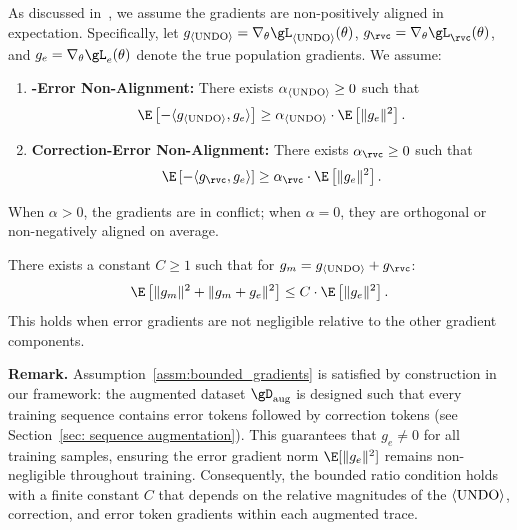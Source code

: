 \begin{assumption}\label{assm:gradient_conflict}
As discussed in~\citet{yu2020gradient}, we assume the gradients are non-positively aligned in expectation. Specifically, let $g_{\bk} = \nabla_\theta \gL_{\bk}(\theta)$, $g_\rvc = \nabla_\theta \gL_\rvc(\theta)$, and $g_e = \nabla_\theta \gL_e(\theta)$ denote the true population gradients.
We assume:
\begin{enumerate}[label=(\alph*), noitemsep, topsep=2pt]
    \item \textbf{\bk-Error Non-Alignment:} There exists $\alpha_{\langle\textnormal{UNDO}\rangle} \geq 0$ such that
    \begin{equation}
        \E\left[-\langle g_{\bk}, g_e \rangle\right] \geq \alpha_{\bk} \cdot \E\left[\|g_e\|^2\right].
    \end{equation}
    \item \textbf{Correction-Error Non-Alignment:} There exists $\alpha_\rvc \geq 0$ such that
    \begin{equation}
        \E\left[-\langle g_\rvc, g_e \rangle\right] \geq \alpha_\rvc \cdot \E\left[\|g_e\|^2\right].
    \end{equation}
\end{enumerate}
When $\alpha > 0$, the gradients are in conflict; when $\alpha = 0$, they are orthogonal or non-negatively aligned on average.
\end{assumption}


\begin{assumption}\label{assm:bounded_gradients}
There exists a constant $C \geq 1$ such that for $g_m = g_{\bk} + g_\rvc$:
\begin{equation}
    \E\left[\|g_m\|^2 + \|g_m + g_e\|^2\right] \leq C \cdot \E\left[\|g_e\|^2\right].
\end{equation}
This holds when error gradients are not negligible relative to the other gradient components.
\end{assumption}

\textbf{Remark.} Assumption~\ref{assm:bounded_gradients} is satisfied by construction in our framework: the augmented dataset $\gD_\text{aug}$ is designed such that every training sequence contains error tokens followed by correction tokens (see Section~\ref{sec: sequence augmentation}). This guarantees that $g_e \neq 0$ for all training samples, ensuring the error gradient norm $\E[\|g_e\|^2]$ remains non-negligible throughout training. Consequently, the bounded ratio condition holds with a finite constant $C$ that depends on the relative magnitudes of the $\langle\textnormal{UNDO}\rangle$, correction, and error token gradients within each augmented trace.

